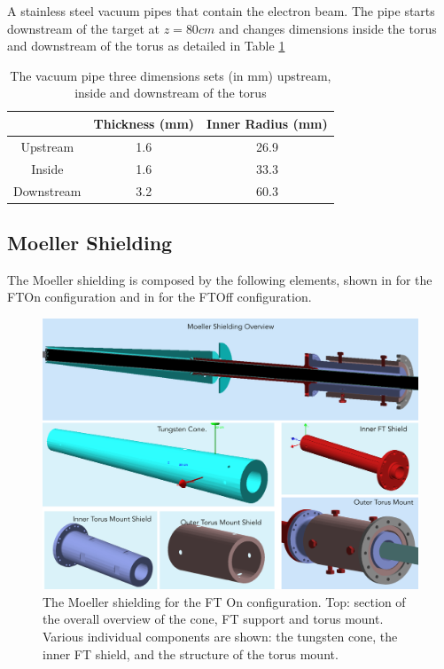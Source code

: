 A stainless steel vacuum pipes that contain the electron beam. The pipe starts downstream of the target at $z=80cm$
and changes dimensions inside the torus and downstream of the torus as detailed in Table \ref{tab:beampipe}

\begin{table}[h]
	\begin{center}
		\begin{tabular}{| c | c | c |}
			\hline \hline
			                & Thickness (mm) & Inner Radius (mm)   \\
			\hline
              Upstream      &    1.6     &    26.9 \\
              Inside        &    1.6     &    33.3 \\
            Downstream      &    3.2     &    60.3 \\
			\hline \hline
		\end{tabular}
	\end{center}
	\caption{The vacuum pipe three dimensions sets (in mm) upstream, inside and downstream of the torus}\label{tab:beampipe}
\end{table}


\subsection{Moeller Shielding}
The Moeller shielding is composed by the following elements, shown in  for the FTOn configuration
and in  for the FTOff configuration.

\begin{figure}
	\centering
	\includegraphics[width=0.98\columnwidth,keepaspectratio]{img/moellerShieldingFTOn.png}
	\caption{The Moeller shielding for the FT On configuration. Top: section of the overall overview of the cone, FT support and torus mount.
		     Various individual components are shown: the tungsten cone, the inner FT shield, and the structure of the torus mount.}
	\label{fig:moellerShieldingFTOn}
\end{figure}

